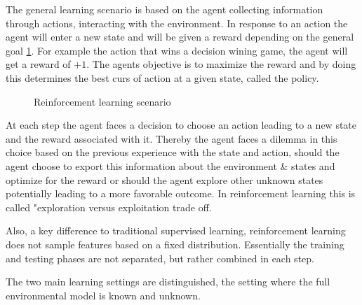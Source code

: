 The general learning scenario is based on the agent collecting information
through actions, interacting with the environment. In response to an action
the agent will enter a new state and will be given a reward depending on the
general goal \ref{fig: 1}. For example the action that wins a decision wining game, the
agent will get a reward of $+1$. The agents objective is to maximize the
reward and by doing this determines the best curs of action at a given
state, called the policy.

\begin{figure}[h!]
    \centering
    \caption{Reinforcement learning scenario \label{fig: 1}}
\end{figure}

At each step the agent faces a decision to choose an action leading to a new
state and the reward associated with it. Thereby the agent faces a dilemma in
this choice based on the previous experience with the state and action,
should the agent choose to export this information about the environment \&
states and optimize for the reward or should the agent explore other unknown
states potentially leading to a more favorable outcome. In reinforcement
learning this is called "exploration versus exploitation trade off.

Also, a key difference to traditional supervised learning, reinforcement
learning does not sample features based on a fixed distribution. Essentially
the training and testing phases are not separated, but rather combined in
each step.
\newline

The two main learning settings are distinguished, the setting where the
full environmental model is known and unknown.

